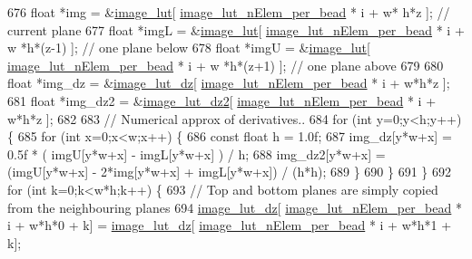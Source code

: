 \begin{DoxyCode}
676                 \textcolor{keywordtype}{float} *img = &\hyperlink{class_queued_c_p_u_tracker_af7ac0b5f68de59f97fa76a02c11763fe}{image\_lut}[ \hyperlink{class_queued_c_p_u_tracker_ac89ec6a24b361816350966d575e0b133}{image\_lut\_nElem\_per\_bead} * i + w*
      h*z ]; \textcolor{comment}{// current plane}
677                 \textcolor{keywordtype}{float} *imgL = &\hyperlink{class_queued_c_p_u_tracker_af7ac0b5f68de59f97fa76a02c11763fe}{image\_lut}[ \hyperlink{class_queued_c_p_u_tracker_ac89ec6a24b361816350966d575e0b133}{image\_lut\_nElem\_per\_bead} * i + w
      *h*(z-1) ]; \textcolor{comment}{// one plane below}
678                 \textcolor{keywordtype}{float} *imgU = &\hyperlink{class_queued_c_p_u_tracker_af7ac0b5f68de59f97fa76a02c11763fe}{image\_lut}[ \hyperlink{class_queued_c_p_u_tracker_ac89ec6a24b361816350966d575e0b133}{image\_lut\_nElem\_per\_bead} * i + w
      *h*(z+1) ]; \textcolor{comment}{// one plane above}
679 
680                 \textcolor{keywordtype}{float} *img\_dz = &\hyperlink{class_queued_c_p_u_tracker_a0bc269c162625aecef4044cce5368bf5}{image\_lut\_dz}[ 
      \hyperlink{class_queued_c_p_u_tracker_ac89ec6a24b361816350966d575e0b133}{image\_lut\_nElem\_per\_bead} * i + w*h*z ];
681                 \textcolor{keywordtype}{float} *img\_dz2 = &\hyperlink{class_queued_c_p_u_tracker_a4d61769a342c1af2827d3ede87d5489f}{image\_lut\_dz2}[ 
      \hyperlink{class_queued_c_p_u_tracker_ac89ec6a24b361816350966d575e0b133}{image\_lut\_nElem\_per\_bead} * i + w*h*z ];
682 
683                 \textcolor{comment}{// Numerical approx of derivatives..}
684                 \textcolor{keywordflow}{for} (\textcolor{keywordtype}{int} y=0;y<h;y++) \{
685                     \textcolor{keywordflow}{for} (\textcolor{keywordtype}{int} x=0;x<w;x++) \{
686                         \textcolor{keyword}{const} \textcolor{keywordtype}{float} h = 1.0f;
687                         img\_dz[y*w+x] = 0.5f * ( imgU[y*w+x] - imgL[y*w+x] ) / h;
688                         img\_dz2[y*w+x] = (imgU[y*w+x] - 2*img[y*w+x] + imgL[y*w+x]) / (h*h);
689                     \}
690                 \}
691             \}
692             \textcolor{keywordflow}{for} (\textcolor{keywordtype}{int} k=0;k<w*h;k++) \{
693                 \textcolor{comment}{// Top and bottom planes are simply copied from the neighbouring planes}
694                 \hyperlink{class_queued_c_p_u_tracker_a0bc269c162625aecef4044cce5368bf5}{image\_lut\_dz}[ \hyperlink{class_queued_c_p_u_tracker_ac89ec6a24b361816350966d575e0b133}{image\_lut\_nElem\_per\_bead} * i + w*h*0 + k]
       = \hyperlink{class_queued_c_p_u_tracker_a0bc269c162625aecef4044cce5368bf5}{image\_lut\_dz}[ \hyperlink{class_queued_c_p_u_tracker_ac89ec6a24b361816350966d575e0b133}{image\_lut\_nElem\_per\_bead} * i + w*h*1 + k];

\end{DoxyCode}
